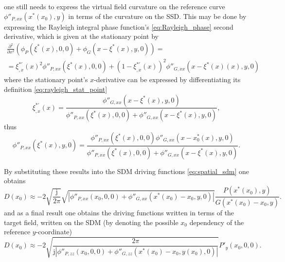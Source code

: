 \documentclass[12pt,a4paper]{article}
\newcommand{\ti}{\mathrm{j}}
\begin{document}
 one still needs to express the virtual field curvature on the reference curve $\phi''_{P,xx}(x^*(x_0),y)$
in terms of the curvature on the SSD. This may be done by expressing the Rayleigh integral phase function's \eqref{eq:Rayleigh_phase} second derivative, which is given at the stationary point by
%
\begin{multline}
\frac{\partial^2}{\partial x^2} \left( \phi_P(\xi^*(x),0,0) + \phi_G(x-\xi^*(x),y,0) \right) = \\
=   \xi^{*'}_{,x}(x)^2 \phi''_{P,xx}(\xi^*(x),0,0) + (1-\xi^{*'}_{,x}(x))^2\phi''_{G,xx	}(x-\xi^*(x)(x),y,0)
\end{multline}
where the stationary point's $x$-derivative can be expressed by differentiating its definition \eqref{eq:rayleigh_stat_point}
\begin{equation}
\xi^{*'}_{,x}(x) =  \frac{ \phi''_{G,xx}(x-\xi^*(x),y,0) }{\phi''_{P,xx}(\xi^*(x),0,0) + \phi''_{G,xx}(x-\xi^*(x),y,0) },
\end{equation}
thus
\begin{equation}
\phi''_{P,xx}( \xi^*(x),y,0 )  =
\frac{ \phi''_{P,xx}(\xi^*(x),0,0) \phi''_{G,xx}(x-x^*_0(x),y,0) }
{\phi''_{P,xx}(\xi^*(x),0,0) + \phi''_{G,xx}(x- \xi^*(x),y,0) } .
\end{equation}

\vspace{3mm}
By substituting these results into the SDM driving functions \eqref{eq:spatial_sdm} one obtains
\begin{equation}
D(x_0) \approx -2
\sqrt{\frac{\ti}{2\pi}} 
\sqrt{ \left| \phi''_{P,xx}(x_0,0,0) + \phi''_{G,xx}(x^*(x_0)-x_0,y,0) 	\right|}
\frac{P(x^*(x_0),y)}{G(x^*(x_0) - x_0,y)}.
\end{equation}
and as a final result one obtains the driving functions written in terms of the target field, written on the SDM (by denoting the possible $x_0$ dependency of the reference $y$-coordinate)
\begin{equation}
D(x_0) \approx -2
\sqrt{ \frac{2\pi}{\ti \left| \phi''_{P,zz}(x_0,0,0	) + \phi''_{G,zz}(x^*(x_0) - x_0,y(x_0),0) \right|}}
 P'_y(x_0,0,0).
\label{eq:SDM_rayleigh}
\end{equation}
\end{document}
